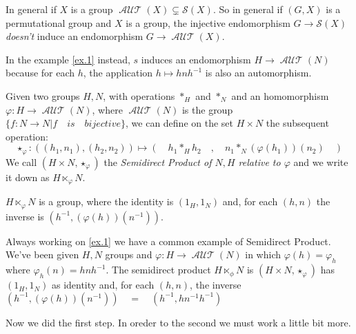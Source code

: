 \documentclass[mat1]{fmfdeloTS}
\DeclareMathOperator{\aut}{\mathcal{AUT}}
\begin{document}
\begin{proposition}
In general if $X$ is a group $\aut(X)\subsetneq\mathcal{S}(X)$. So in general if $(G,X)$ is a permutational group and $X$ is a group, the injective endomorphism $G\longrightarrow\mathcal{S}(X)$ \textit{doesn't} induce an endomorphism $G\longrightarrow\aut(X)$.
\end{proposition}

\begin{example}
In the example \ref{ex.1} instead, $s$ induces an endomorphism $H\longrightarrow\aut(N)$ because for each $h$, the application $h\longmapsto hnh^{-1}$ is also an automorphism.
\end{example}


\begin{definition}
Given two groups $H,N$, with operations $\ast_H$ and $\ast_N$ and an homomorphism $\varphi:H\longrightarrow \aut(N)$, where $\aut(N)$ is the group $\{ f:N\longrightarrow N | f\quad is \quad bijective\}$, we can define on the set $H\times N$ the subsequent operation:
\[
\star_\varphi:((h_1,n_1),(h_2,n_2))\longmapsto (\quad h_1\ast_H h_2\quad,\quad n_1\ast_N(\varphi(h_1))(n_2)\quad)
\]
We call $(H\times N,\star_\varphi)$ the  \textit{Semidirect Product of $N,H$ relative to $\varphi$} and we write it down as $H\ltimes_{\varphi} N$.
\end{definition}

\begin{proposition}
$H\ltimes_{\varphi} N$ is a group, where the identity is $(1_H,1_N)$ and, for each $(h,n)$ the inverse is $(h^{-1},(\varphi(h))(n^{-1}))$.
\end{proposition}


\begin{example}
Always working on \ref{ex.1} we have a common example of Semidirect Product. We've been given $H,N$ groups and $\varphi:H\longrightarrow\aut(N)$ in which $\varphi(h)=\varphi_h$ where $\varphi_h(n)=hnh^{-1}$. The semidirect product $H\ltimes_\phi N$ is $(H\times N, \star_\varphi)$ has $(1_H,1_N)$ as identity and, for each $(h,n)$, the inverse $(h^{-1},(\varphi(h))(n^{-1}))\quad=\quad(h^{-1},hn^{-1}h^{-1})$
\end{example}


Now we did the first step. In oreder to the second we must work a little bit more.
\end{document}
